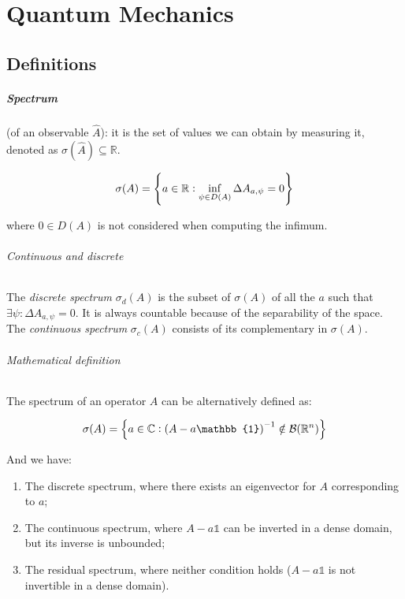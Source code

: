 \documentclass[main.tex]{subfiles}
\begin{document}
\chapter{Quantum Mechanics}


\section{Definitions}

\paragraph{Spectrum} (of an observable $\hat{A}$): it is the set of values we can obtain by measuring it, denoted as $\sigma(\hat{A}) \subseteq \mathbb{R}$.

\begin{equation}
    \sigma(A) = \qty{
    a \in \mathbb{R}: \inf_{\psi \in D(A)} \Delta A_{a, \psi} = 0
    }
\end{equation}

where $0 \in D(A)$ is not considered when computing the infimum.

\subparagraph{Continuous and discrete} The \emph{discrete spectrum} $\sigma_d(A)$ is the subset of $\sigma (A)$ of all the $a$ such that $\exists \psi : \Delta A _{a, \psi} = 0$. It is always countable because of the separability of the space. The \emph{continuous spectrum} $\sigma_c(A)$ consists of its complementary in $\sigma(A)$.

\subparagraph{Mathematical definition} The spectrum of an operator $A$ can be alternatively defined as:

\begin{equation}
\sigma(A) = \qty{
a \in \mathbb{C}: \qty(A - a\mathbb{1})^{-1} \notin \mathcal{B}(\mathbb{R}^n)
}
\end{equation}

And we have:

\begin{enumerate}
    \item The discrete spectrum, where there exists an eigenvector for $A$ corresponding to $a$;
    \item The continuous spectrum, where $A-a\mathbb{1}$ can be inverted in a dense domain, but its inverse is unbounded;
    \item The residual spectrum, where neither condition holds ($A-a\mathbb{1}$ is not invertible in a dense domain).
\end{enumerate}
\end{document}
